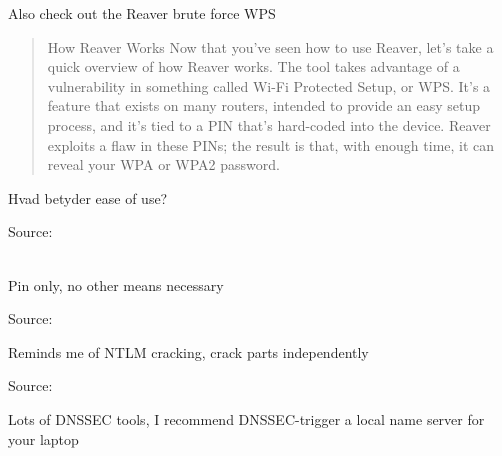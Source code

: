 \documentclass[Screen16to9,17pt]{foils}
\begin{document}
\begin{list1}
\item {}
\item Also check out the Reaver brute force WPS\\ 
\end{list1}


\begin{quote}
How Reaver Works
Now that you've seen how to use Reaver, let's take a quick overview of how Reaver works. The tool takes advantage of a vulnerability in something called Wi-Fi Protected Setup, or WPS. It's a feature that exists on many routers, intended to provide an easy setup process, and it's tied to a PIN that's hard-coded into the device. Reaver exploits a flaw in these PINs; the result is that, with enough time, it can reveal your WPA or WPA2 password.
\end{quote}

\centerline{Hvad betyder ease of use?}

Source: \\
\\
{\footnotesize {}}



\centerline{Pin only, no other means necessary}

Source:\\




\centerline{Reminds me of NTLM cracking, crack parts independently}

Source:\\









Lots of DNSSEC tools, I recommend DNSSEC-trigger a local name server for your laptop
\end{document}
